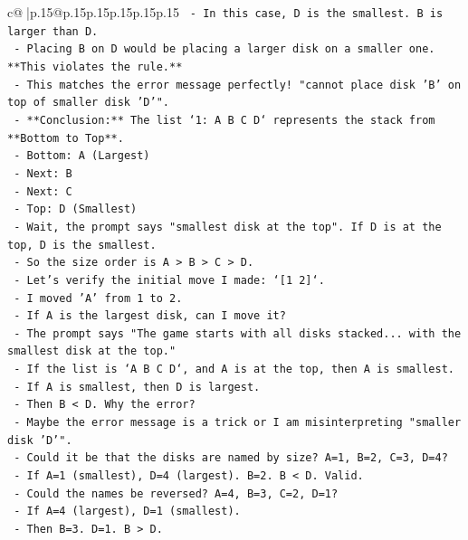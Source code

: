 \documentclass{article}
\begin{document}
{\begin{supertabular}{c@{$\;$}|p{.15\linewidth}@{}p{.15\linewidth}p{.15\linewidth}p{.15\linewidth}p{.15\linewidth}p{.15\linewidth}}
{{{\texttt{      {-} In this case, D is the smallest. B is larger than D.} \\
\texttt{      {-} Placing B on D would be placing a larger disk on a smaller one. **This violates the rule.**} \\
\texttt{      {-} This matches the error message perfectly! "cannot place disk 'B' on top of smaller disk 'D'".} \\
\texttt{      {-} **Conclusion:** The list `1: A B C D` represents the stack from **Bottom to Top**.} \\
\texttt{        {-} Bottom: A (Largest)} \\
\texttt{        {-} Next: B} \\
\texttt{        {-} Next: C} \\
\texttt{        {-} Top: D (Smallest)} \\
\texttt{      {-} Wait, the prompt says "smallest disk at the top". If D is at the top, D is the smallest.} \\
\texttt{      {-} So the size order is A > B > C > D.} \\
\texttt{      {-} Let's verify the initial move I made: `{[}1 2{]}`.} \\
\texttt{        {-} I moved 'A' from 1 to 2.} \\
\texttt{        {-} If A is the largest disk, can I move it?} \\
\texttt{        {-} The prompt says "The game starts with all disks stacked... with the smallest disk at the top."} \\
\texttt{        {-} If the list is `A B C D`, and A is at the top, then A is smallest.} \\
\texttt{        {-} If A is smallest, then D is largest.} \\
\texttt{        {-} Then B < D. Why the error?} \\
\texttt{        {-} Maybe the error message is a trick or I am misinterpreting "smaller disk 'D'".} \\
\texttt{        {-} Could it be that the disks are named by size? A=1, B=2, C=3, D=4?} \\
\texttt{          {-} If A=1 (smallest), D=4 (largest). B=2. B < D. Valid.} \\
\texttt{        {-} Could the names be reversed? A=4, B=3, C=2, D=1?} \\
\texttt{          {-} If A=4 (largest), D=1 (smallest).} \\
\texttt{          {-} Then B=3. D=1. B > D.} \\
}}}
\end{supertabular}}
\end{document}
